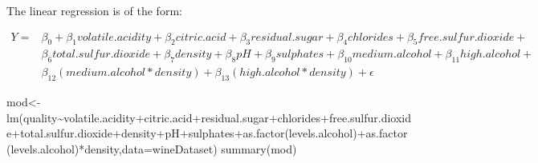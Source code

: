 \documentclass[
]{article}
\newenvironment{Shaded}{\begin{snugshade}}{\end{snugshade}}
\newcommand{\AttributeTok}[1]{\textcolor[rgb]{0.77,0.63,0.00}{#1}}
\newcommand{\FunctionTok}[1]{\textcolor[rgb]{0.00,0.00,0.00}{#1}}
\newcommand{\NormalTok}[1]{#1}
\newcommand{\OtherTok}[1]{\textcolor[rgb]{0.56,0.35,0.01}{#1}}
\newcommand{\SpecialCharTok}[1]{\textcolor[rgb]{0.00,0.00,0.00}{#1}}
\begin{document}
The linear regression is of the form:

\[
\begin{align}
Y = &\beta_{0} + \beta_{1}volatile.acidity + \beta_{2}citric.acid + \beta_{3}residual.sugar + \beta_{4}chlorides + \beta_{5}free.sulfur.dioxide + \\ 
&\beta_{6}total.sulfur.dioxide + \beta_{7}density + \beta_{8}pH + \beta_{9}sulphates + \beta_{10}medium.alcohol +  \beta_{11}high.alcohol +  \\ 
& \beta_{12}(medium.alcohol*density) + \beta_{13}(high.alcohol*density) + \epsilon
\end{align}
\]

\begin{Shaded}
\begin{Highlighting}[]
\NormalTok{mod}\OtherTok{\textless{}{-}}\FunctionTok{lm}\NormalTok{(quality}\SpecialCharTok{\textasciitilde{}}\NormalTok{volatile.acidity}\SpecialCharTok{+}\NormalTok{citric.acid}\SpecialCharTok{+}\NormalTok{residual.sugar}\SpecialCharTok{+}\NormalTok{chlorides}\SpecialCharTok{+}\NormalTok{free.sulfur.dioxide}\SpecialCharTok{+}\NormalTok{total.sulfur.dioxide}\SpecialCharTok{+}\NormalTok{density}\SpecialCharTok{+}\NormalTok{pH}\SpecialCharTok{+}\NormalTok{sulphates}\SpecialCharTok{+}\FunctionTok{as.factor}\NormalTok{(levels.alcohol)}\SpecialCharTok{+}\FunctionTok{as.factor}\NormalTok{(levels.alcohol)}\SpecialCharTok{*}\NormalTok{density,}\AttributeTok{data=}\NormalTok{wineDataset)}
\FunctionTok{summary}\NormalTok{(mod)}
\end{Highlighting}
\end{Shaded}
\end{document}
